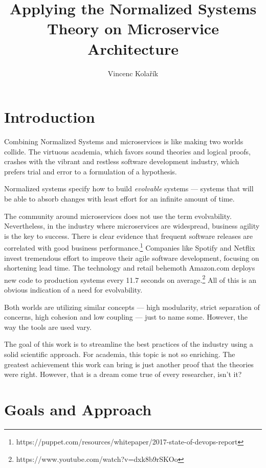 \documentclass[thesis=M,english,hidelinks]{FITthesis}[2012/10/20]
\title{Applying the Normalized Systems Theory on Microservice Architecture}
\author{Vincenc Kolařík} %
\begin{document}
% 
% 
\chapter{Introduction}

Combining Normalized Systems and microservices is like making two worlds collide. The virtuous academia, which favors sound theories and logical proofs, crashes with the vibrant and restless software development industry, which prefers trial and error to a formulation of a hypothesis.

Normalized systems specify how to build \textit{evolvable} systems --- systems that will be able to absorb changes with least effort for an infinite amount of time.

The community around microservices does not use the term evolvability. Nevertheless, in the industry where microservices are widespread, business agility is the key to success. There is clear evidence that frequent software releases are correlated with good business performance.\footnote{https://puppet.com/resources/whitepaper/2017-state-of-devops-report} Companies like Spotify and Netflix invest tremendous effort to improve their agile software development, focusing on shortening lead time. The technology and retail behemoth Amazon.com deploys new code to production systems every 11.7 seconds on average.\footnote{https://www.youtube.com/watch?v=dxk8b9rSKOo} All of this is an obvious indication of a need for evolvability.

Both worlds are utilizing similar concepts --- high modularity, strict separation of concerns, high cohesion and low coupling --- just to name some. However, the way the tools are used vary.

The goal of this work is to streamline the best practices of the industry using a solid scientific approach. For academia, this topic is not so enriching. The greatest achievement this work can bring is just another proof that the theories were right. However, that is a dream come true of every researcher, isn’t it?


% 
% 
\chapter{Goals and Approach}
\end{document}
